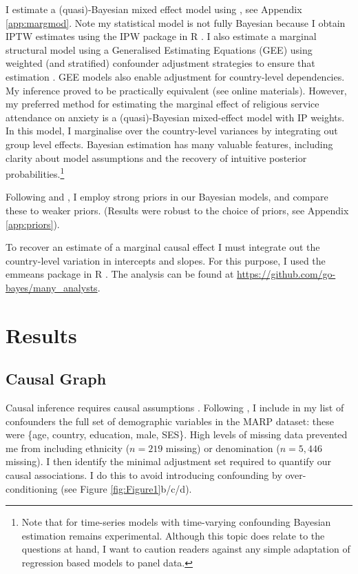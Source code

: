 \documentclass[]{interact}
\theoremstyle{plain}%
\theoremstyle{definition}
\theoremstyle{remark}
\begin{document}
I estimate a (quasi)-Bayesian mixed effect model using \citep{burkner_bayesian_2021}, 
see Appendix \ref{app:margmod}. Note my statistical model is not fully Bayesian because I obtain IPTW estimates using the IPW package in R \citep{wal_ipw_2011}. 
I also estimate a marginal structural model using a Generalised Estimating Equations (GEE) using weighted (and stratified) confounder adjustment strategies to ensure that estimation \citep{halekoh_r_2006}. 
GEE models also enable adjustment for country-level dependencies. My inference proved to be practically equivalent (see online materials). However, my preferred method for estimating the marginal effect of religious service attendance on anxiety is a (quasi)-Bayesian mixed-effect model with IP weights. In this model, I marginalise over the country-level variances by integrating out group level effects. Bayesian estimation has many valuable features, including clarity about model assumptions and the recovery of intuitive posterior probabilities.\footnote{Note that for time-series models with time-varying confounding Bayesian estimation remains experimental. Although this topic does relate to the questions at hand, I want to caution readers against any simple adaptation of regression based models to panel data.}

Following \citet{gelman_bayesian_2020} 
and \citet{mcelreath_statistical_2020}, I employ strong priors in our Bayesian models, and compare these to weaker priors. (Results were robust to the choice of priors, see Appendix \ref{app:priors}). 

To recover an estimate of a marginal causal effect I must integrate out the country-level variation in intercepts and slopes. For this purpose, I used the emmeans package in R \citep{lenth_emmeans_2022}. 
The analysis can be found at \href{https://github.com/go-bayes/many_analysts}{https://github.com/go-bayes/many\_analysts}.

\section{Results}

\subsection{Causal Graph}

Causal inference requires causal assumptions \citep{vanderweele_explanation_2015,pearl_causal_2009, pearl_seven_2019,mcelreath_statistical_2020,vanderweele_outcome-wide_2020, bulbulia_causal_2021}. 
Following \citet{vanderweele_explanation_2015}, I include in my list of confounders the full set of demographic variables in the MARP dataset: these were \{age, country, education, male, SES\}. High levels of missing data prevented me from including ethnicity ($n  = 219$ missing) or denomination ($n=5,446$ missing). I then identify the minimal adjustment set required to quantify our causal associations. I do this to avoid introducing confounding by over-conditioning (see Figure \ref{fig:Figure1}b/c/d). 
\end{document}
